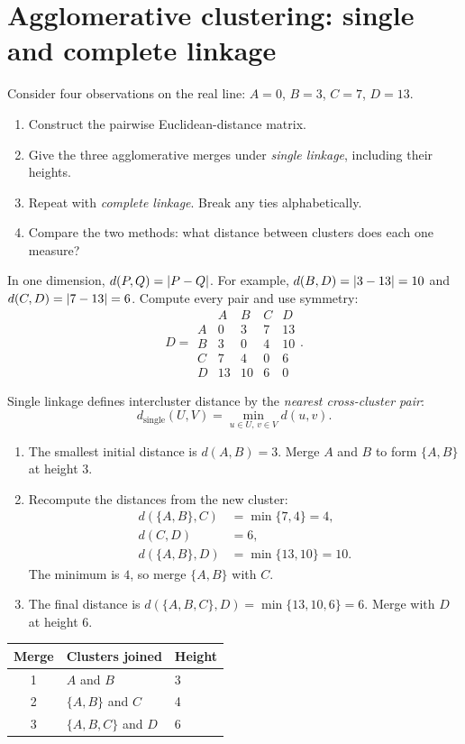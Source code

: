 \section{Agglomerative clustering: single and complete linkage}
\label{sec:ex5}
\begin{problem}
Consider four observations on the real line: $A=0$, $B=3$, $C=7$, $D=13$.
\begin{enumerate}[label=\textbf{(\alph*)}]
\item Construct the pairwise Euclidean-distance matrix.
\item Give the three agglomerative merges under \emph{single linkage}, including their heights.
\item Repeat with \emph{complete linkage}. Break any ties alphabetically.
\item Compare the two methods: what distance between clusters does each one measure?
\end{enumerate}
\end{problem}


In one dimension, $d(P,Q)=\left\lvert P-Q\right\rvert$. For example, $d(B,D)=\left\lvert3-13\right\rvert=10$ and $d(C,D)=\left\lvert7-13\right\rvert=6$. Compute every pair and use symmetry:
\[
D=\begin{array}{c|rrrr}
& A & B & C & D\\\hline
A&0&3&7&13\\
B&3&0&4&10\\
C&7&4&0&6\\
D&13&10&6&0
\end{array}.
\]

Single linkage defines intercluster distance by the \emph{nearest cross-cluster pair}:
\[
d_{\mathrm{single}}(U,V)=\min_{u\in U,\,v\in V} d(u,v).
\]
\begin{enumerate}[label=\textbf{Step \arabic*.}]
\item The smallest initial distance is $d(A,B)=3$. Merge $A$ and $B$ to form $\{A,B\}$ at height $3$.
\item Recompute the distances from the new cluster:
\[
\begin{aligned}
d(\{A,B\},C)&=\min\{7,4\}=4,\\
d(C,D)&=6,\\
d(\{A,B\},D)&=\min\{13,10\}=10.
\end{aligned}
\]
The minimum is $4$, so merge $\{A,B\}$ with $C$.
\item The final distance is $d(\{A,B,C\},D)=\min\{13,10,6\}=6$. Merge with $D$ at height $6$.
\end{enumerate}
\begin{center}\begin{tabular}{@{}cll@{}}\toprule Merge&Clusters joined&Height\\\midrule 1&$A$ and $B$&3\\2&$\{A,B\}$ and $C$&4\\3&$\{A,B,C\}$ and $D$&6\\\bottomrule\end{tabular}\end{center}

